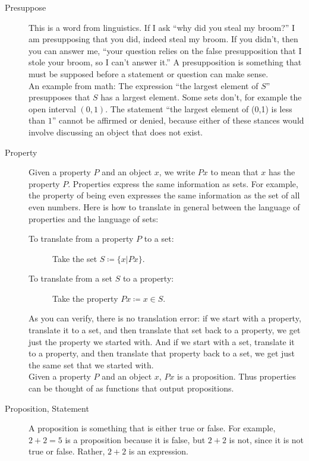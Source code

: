 \documentclass[12pt]{article}
\begin{document}
\begin{description}
  \item[Presuppose] This is a word from linguistics.  If I ask ``why
    did you steal my broom?''  I am presupposing that you did, indeed
    steal my broom.  If you didn't, then you can answer me, ``your
    question relies on the false presupposition that I stole your
    broom, so I can't answer it.''  A presupposition is something that
    must be supposed before a statement or question can make sense.\\

    An example from math: The expression ``the largest element of
    $S$'' presupposes that $S$ has a largest element.  Some sets
    don't, for example the open interval $(0,1)$.  The statement ``the
    largest element of (0,1) is less than $1$'' cannot be affirmed or
    denied, because either of these stances would involve discussing
    an object that does not exist. 
    
  \item[Property] Given a property $P$ and an object $x$, we write
    $Px$ to mean that $x$ has the property $P$.  Properties express
    the same information as sets.  For example, the property of being
    even expresses the same information as the set of all even
    numbers.  Here is how to translate in general between the language
    of properties and the language of sets:
    \begin{description}
    \item[To translate from a property $P$ to a set:] Take the set $S\coloneqq\{x|Px\}$.
    \item[To translate from a set $S$ to a property:] Take the
      property $Px\coloneqq x\in S$.
    \end{description}
    As you can verify, there is no translation error: if we start with
    a property, translate it to a set, and then translate that set
    back to a property, we get just the property we started with.  And
    if we start with a set, translate it to a property, and then
    translate that property back to a set, we get just the same set
    that we started with. \\

    Given a property $P$ and an object $x$, $Px$ is a proposition.
    Thus properties can be thought of as functions that output
    propositions.

  \item[Proposition, Statement] A proposition is something that is
    either true or false.  For example, $2+2=5$ is a proposition
    because it is false, but $2+2$ is not, since it is not true or
    false.  Rather, $2+2$ is an expression. \\


\end{description}
\end{document}
